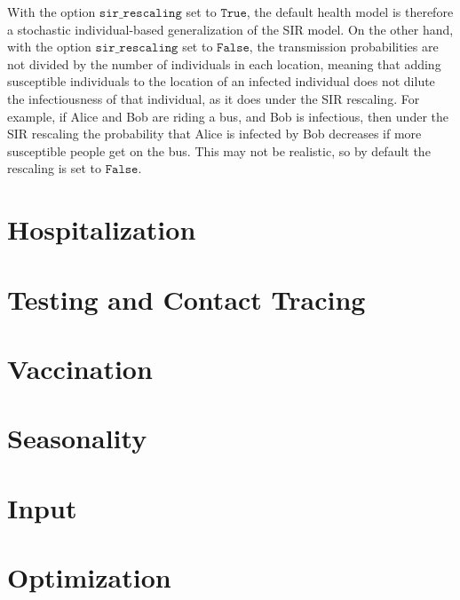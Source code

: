 \documentclass[10pt,letterpaper]{article}
\begin{document}
With the option $\texttt{sir{\_}rescaling}$ set to $\texttt{True}$, the default health model is therefore a stochastic individual-based generalization of the SIR model. On the other hand, with the option $\texttt{sir{\_}rescaling}$ set to $\texttt{False}$, the transmission probabilities are not divided by the number of individuals in each location, meaning that adding susceptible individuals to the location of an infected individual does not dilute the infectiousness of that individual, as it does under the SIR rescaling. For example, if Alice and Bob are riding a bus, and Bob is infectious, then under the SIR rescaling the probability that Alice is infected by Bob decreases if more susceptible people get on the bus. This may not be realistic, so by default the rescaling is set to $\texttt{False}$.

\section{Hospitalization}

\section{Testing and Contact Tracing}

\section{Vaccination}

\section{Seasonality}

\section{Input}

\section{Optimization}
\end{document}
